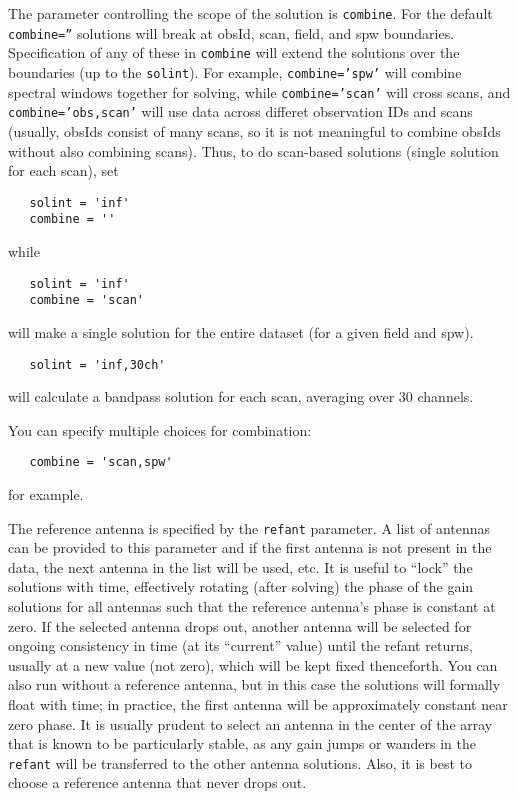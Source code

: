 The parameter controlling the scope of the solution is {\tt combine}.
For the default {\tt combine=''} solutions will break at obsId, scan,
field, and spw boundaries.  Specification of any of these in {\tt combine} will
extend the solutions over the boundaries (up to the {\tt solint}). 
For example, {\tt combine='spw'} will combine spectral windows
together for solving, while {\tt combine='scan'} will cross scans, and
{\tt combine='obs,scan'} will use data across differet observation
IDs and scans (usually, obsIds consist of many scans, so it is
not meaningful to combine obsIds without also combining scans).  
Thus, to do scan-based solutions (single solution for each scan), set
\small
\begin{verbatim}
   solint = 'inf'
   combine = ''
\end{verbatim} 
\normalsize
while
\small
\begin{verbatim}
   solint = 'inf'
   combine = 'scan'
\end{verbatim} 
\normalsize
will make a single solution for the entire dataset (for a given field
and spw).  
\small
\begin{verbatim}
   solint = 'inf,30ch'
\end{verbatim}
will calculate a bandpass solution for each scan, averaging over 30
channels.

You can specify multiple choices for combination:
\small
\begin{verbatim}
   combine = 'scan,spw'
\end{verbatim} 
\normalsize
for example.

The reference antenna is specified by the {\tt refant} parameter. A
list of antennas can be provided to this parameter and if the first
antenna is not present in the data, the next antenna in the list will
be used, etc.  It is useful to ``lock'' the solutions with time,
effectively rotating (after solving) the phase of the gain solutions
for all antennas such that the reference antenna's phase is constant
at zero.  If the selected antenna drops out, another antenna will be
selected for ongoing consistency in time (at its ``current'' value)
until the refant returns, usually at a new value (not zero), which
will be kept fixed thenceforth.  You can also run without a reference
antenna, but in this case the solutions will formally float with time;
in practice, the first antenna will be approximately constant near
zero phase.  It is usually prudent to select an antenna in the center
of the array that is known to be particularly stable, as any gain
jumps or wanders in the {\tt refant} will be transferred to the other
antenna solutions.  Also, it is best to choose a reference antenna
that never drops out.



